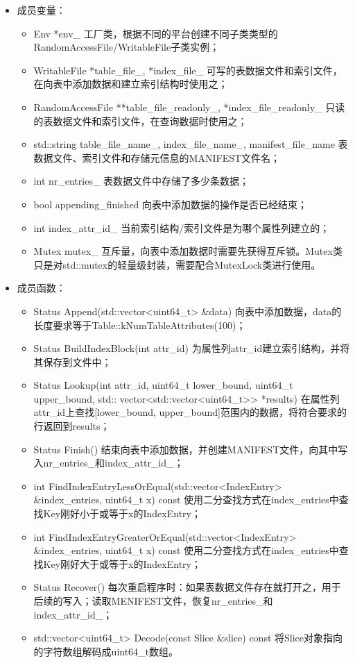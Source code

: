 \documentclass[bachelor]{thesis-uestc}
\begin{document}
\begin{itemize}
	\item 成员变量：
	\begin{itemize}
		\item Env *env\_ 工厂类，根据不同的平台创建不同子类类型的RandomAccessFile/WritableFile子类实例；
		\item WritableFile *table\_file\_, *index\_file\_ 可写的表数据文件和索引文件，在向表中添加数据和建立索引结构时使用之；
		\item RandomAccessFile **table\_file\_readonly\_, *index\_file\_readonly\_ 只读的表数据文件和索引文件，在查询数据时使用之；
		\item std::string table\_file\_name\_, index\_file\_name\_, manifest\_file\_name 表数据文件、索引文件和存储元信息的MANIFEST文件名；
		\item int nr\_entries\_ 表数据文件中存储了多少条数据；
		\item bool appending\_finished 向表中添加数据的操作是否已经结束；
		\item int index\_attr\_id\_ 当前索引结构/索引文件是为哪个属性列建立的；
		\item Mutex mutex\_ 互斥量，向表中添加数据时需要先获得互斥锁。Mutex类只是对std::mutex的轻量级封装，需要配合MutexLock类进行使用。
	\end{itemize}
	\item 成员函数：
	\begin{itemize}
		\item Status Append(std::vector<uint64\_t> \&data) 向表中添加数据，data的长度要求等于Table::kNumTableAttributes(100)；
		\item Status BuildIndexBlock(int attr\_id) 为属性列attr\_id建立索引结构，并将其保存到文件中；
		\item Status Lookup(int attr\_id, uint64\_t lower\_bound, uint64\_t upper\_bound, std:: vector<std::vector<uint64\_t>> *results) 在属性列attr\_id上查找[lower\_bound, upper\_bound]范围内的数据，将符合要求的行返回到results；
		\item Status Finish() 结束向表中添加数据，并创建MANIFEST文件，向其中写入nr\_entries\_和index\_attr\_id\_；
		\item int FindIndexEntryLessOrEqual(std::vector<IndexEntry> \&index\_entries, uint64\_t x) const 使用二分查找方式在index\_entries中查找Key刚好小于或等于x的IndexEntry；
		\item int FindIndexEntryGreaterOrEqual(std::vector<IndexEntry> \&index\_entries, uint64\_t x) const 使用二分查找方式在index\_entries中查找Key刚好大于或等于x的IndexEntry；
		\item Status Recover() 每次重启程序时：如果表数据文件存在就打开之，用于后续的写入；读取MENIFEST文件，恢复nr\_entries\_和index\_attr\_id\_；
		\item std::vector<uint64\_t> Decode(const Slice \&slice) const 将Slice对象指向的字符数组解码成uint64\_t数组。
	\end{itemize}
\end{itemize}
\end{document}
